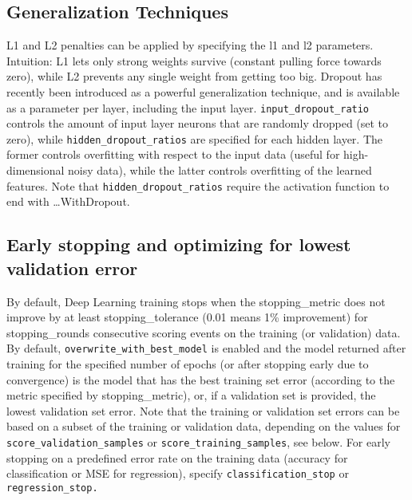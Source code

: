 \documentclass[]{book}
\begin{document}
\hypertarget{generalization-techniques}{%
\subsection{Generalization Techniques}\label{generalization-techniques}}

L1 and L2 penalties can be applied by specifying the l1 and l2 parameters. Intuition: L1 lets only strong weights survive (constant pulling force towards zero), while L2 prevents any single weight from getting too big. Dropout has recently been introduced as a powerful generalization technique, and is available as a parameter per layer, including the input layer. \texttt{input\_dropout\_ratio} controls the amount of input layer neurons that are randomly dropped (set to zero), while \texttt{hidden\_dropout\_ratios} are specified for each hidden layer. The former controls overfitting with respect to the input data (useful for high-dimensional noisy data), while the latter controls overfitting of the learned features. Note that \texttt{hidden\_dropout\_ratios} require the activation function to end with \ldots{}WithDropout.

\hypertarget{early-stopping-and-optimizing-for-lowest-validation-error}{%
\subsection{Early stopping and optimizing for lowest validation error}\label{early-stopping-and-optimizing-for-lowest-validation-error}}

By default, Deep Learning training stops when the stopping\_metric does not improve by at least stopping\_tolerance (0.01 means 1\% improvement) for stopping\_rounds consecutive scoring events on the training (or validation) data. By default, \texttt{overwrite\_with\_best\_model} is enabled and the model returned after training for the specified number of epochs (or after stopping early due to convergence) is the model that has the best training set error (according to the metric specified by stopping\_metric), or, if a validation set is provided, the lowest validation set error. Note that the training or validation set errors can be based on a subset of the training or validation data, depending on the values for \texttt{score\_validation\_samples} or \texttt{score\_training\_samples}, see below. For early stopping on a predefined error rate on the training data (accuracy for classification or MSE for regression), specify \texttt{classification\_stop} or \texttt{regression\_stop.}
\end{document}
